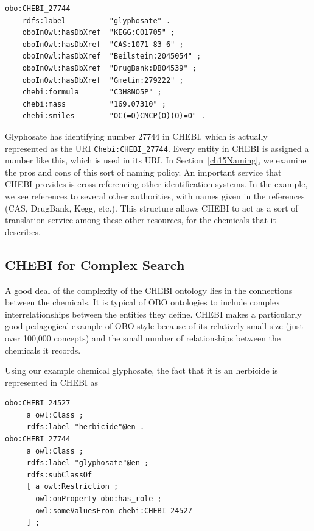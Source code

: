 \begin{lstlisting}
obo:CHEBI_27744  
    rdfs:label          "glyphosate" .
    oboInOwl:hasDbXref  "KEGG:C01705" ;
    oboInOwl:hasDbXref  "CAS:1071-83-6" ;
    oboInOwl:hasDbXref  "Beilstein:2045054" ;
    oboInOwl:hasDbXref  "DrugBank:DB04539" ;
    oboInOwl:hasDbXref  "Gmelin:279222" ;
    chebi:formula       "C3H8NO5P" ;
    chebi:mass          "169.07310" ;
    chebi:smiles        "OC(=O)CNCP(O)(O)=O" .
\end{lstlisting}

Glyphosate has identifying number 27744 in CHEBI, which is actually
represented as the URI \texttt{Chebi:CHEBI\_27744}. Every entity in CHEBI is
assigned a number like this, which is used in its URI.  In Section~\ref{ch15Naming}, we
examine the pros and cons of this sort of naming policy. 
An important service that CHEBI provides is cross-referencing other identification
systems.  
In the example, we see references to several other
authorities, with names given in the references (CAS, DrugBank, Kegg,
etc.). This structure allows CHEBI to act as a sort of
translation service among these other resources, for the chemicals that
it describes.


\subsection{CHEBI for Complex Search}

A good deal of the complexity of the CHEBI ontology lies in the
connections between the chemicals. It is typical of OBO ontologies to
include complex interrelationships between the entities they define.
CHEBI makes a particularly good pedagogical example of OBO style because
of its relatively small size (just over 100,000 concepts) and the small number
of relationships between the chemicals it records.

Using our example chemical glyphosate, the fact that it is an herbicide
is represented in CHEBI as

\begin{lstlisting}
obo:CHEBI_24527
     a owl:Class ;
     rdfs:label "herbicide"@en .
obo:CHEBI_27744
     a owl:Class ;
     rdfs:label "glyphosate"@en ;
     rdfs:subClassOf
     [ a owl:Restriction ;
       owl:onProperty obo:has_role ;
       owl:someValuesFrom chebi:CHEBI_24527
     ] ;
\end{lstlisting}


